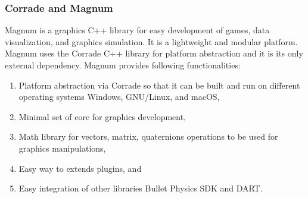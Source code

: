 \subsubsection{Corrade and Magnum}
Magnum is a graphics C++ library for easy development of games, data visualization, and graphics simulation. It is a lightweight and modular platform. Magnum uses the Corrade C++ library for platform abstraction and it is its only external dependency. Magnum provides following functionalities:

\begin{enumerate}
  \item Platform abstraction via Corrade so that it can be built and run on different operating systems \eg Windows, GNU/Linux, and macOS,
  \item Minimal set of core  for graphics development,
  \item Math library for vectors, matrix, quaternions operations to be used for graphics manipulations,
  \item Easy way to extends plugins, and
  \item Easy integration of other libraries \eg Bullet Physics SDK and DART.
\end{enumerate}

